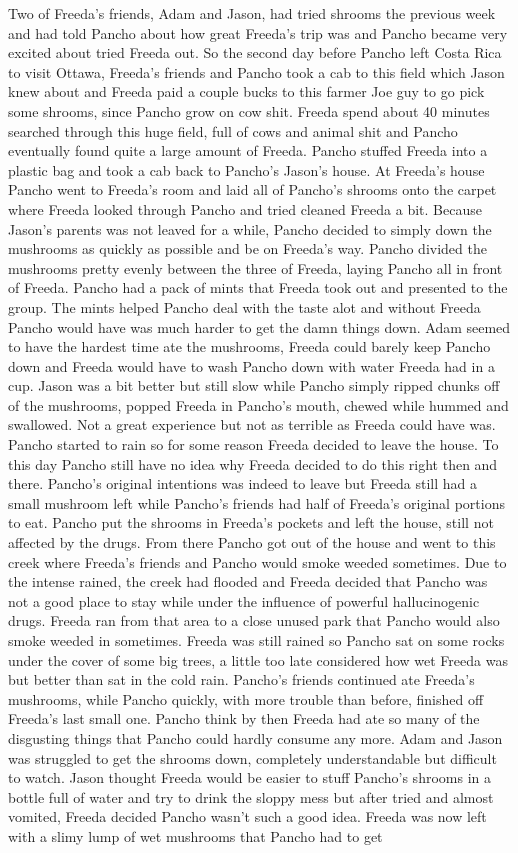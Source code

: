 \documentclass[12pt]{book}
\begin{document}
Two of Freeda's friends, Adam and Jason, had tried shrooms the previous week and had told Pancho about how great Freeda's trip was and Pancho became very excited about tried Freeda out. So the second day before Pancho left Costa Rica to visit Ottawa, Freeda's friends and Pancho took a cab to this field which Jason knew about and Freeda paid a couple bucks to this farmer Joe guy to go pick some shrooms, since Pancho grow on cow shit. Freeda spend about 40 minutes searched through this huge field, full of cows and animal shit and Pancho eventually found quite a large amount of Freeda. Pancho stuffed Freeda into a plastic bag and took a cab back to Pancho's Jason's house. At Freeda's house Pancho went to Freeda's room and laid all of Pancho's shrooms onto the carpet where Freeda looked through Pancho and tried cleaned Freeda a bit. Because Jason's parents was not leaved for a while, Pancho decided to simply down the mushrooms as quickly as possible and be on Freeda's way. Pancho divided the mushrooms pretty evenly between the three of Freeda, laying Pancho all in front of Freeda. Pancho had a pack of mints that Freeda took out and presented to the group. The mints helped Pancho deal with the taste alot and without Freeda Pancho would have was much harder to get the damn things down. Adam seemed to have the hardest time ate the mushrooms, Freeda could barely keep Pancho down and Freeda would have to wash Pancho down with water Freeda had in a cup. Jason was a bit better but still slow while Pancho simply ripped chunks off of the mushrooms, popped Freeda in Pancho's mouth, chewed while hummed and swallowed. Not a great experience but not as terrible as Freeda could have was. Pancho started to rain so for some reason Freeda decided to leave the house. To this day Pancho still have no idea why Freeda decided to do this right then and there. Pancho's original intentions was indeed to leave but Freeda still had a small mushroom left while Pancho's friends had half of Freeda's original portions to eat. Pancho put the shrooms in Freeda's pockets and left the house, still not affected by the drugs. From there Pancho got out of the house and went to this creek where Freeda's friends and Pancho would smoke weeded sometimes. Due to the intense rained, the creek had flooded and Freeda decided that Pancho was not a good place to stay while under the influence of powerful hallucinogenic drugs. Freeda ran from that area to a close unused park that Pancho would also smoke weeded in sometimes. Freeda was still rained so Pancho sat on some rocks under the cover of some big trees, a little too late considered how wet Freeda was but better than sat in the cold rain. Pancho's friends continued ate Freeda's mushrooms, while Pancho quickly, with more trouble than before, finished off Freeda's last small one. Pancho think by then Freeda had ate so many of the disgusting things that Pancho could hardly consume any more. Adam and Jason was struggled to get the shrooms down, completely understandable but difficult to watch. Jason thought Freeda would be easier to stuff Pancho's shrooms in a bottle full of water and try to drink the sloppy mess but after tried and almost vomited, Freeda decided Pancho wasn't such a good idea. Freeda was now left with a slimy lump of wet mushrooms that Pancho had to get 
\end{document}

